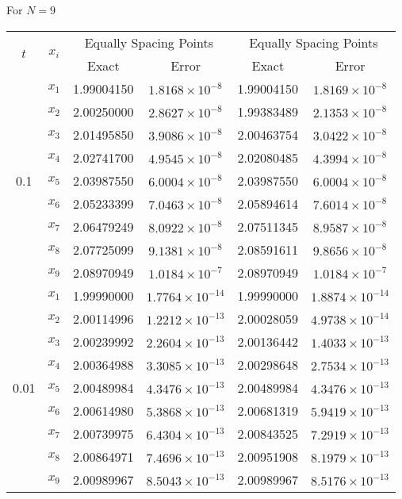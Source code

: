 \documentclass[12pt, a4paper]{article}
\begin{document}
For \( N = 9 \)

\begin{table}[ht]
	\renewcommand{\arraystretch}{1.5}
	\centering
	\begin{tabular}{|c|c|c|c|c|c|}
		\hline
		\multirow{2}{*}{\( t \)} & \multirow{2}{*}{\( x_i \)} & \multicolumn{2}{c|}{Equally Spacing Points} & \multicolumn{2}{c|}{Equally Spacing Points} \\
		\cline{3-6}
		& & Exact & Error & Exact & Error \\
		\hline
		\multirow{9}{*}{0.1} & \( x_1 \) & 1.99004150 & \( 1.8168 \times 10^{-8} \) & 1.99004150 & \( 1.8169 \times 10^{-8} \) \\
		& \( x_2 \) & 2.00250000 & \( 2.8627 \times 10^{-8} \) & 1.99383489 & \( 2.1353 \times 10^{-8} \) \\
		& \( x_3 \) & 2.01495850 & \( 3.9086 \times 10^{-8} \) & 2.00463754 & \( 3.0422 \times 10^{-8} \) \\
		& \( x_4 \) & 2.02741700 & \( 4.9545 \times 10^{-8} \) & 2.02080485 & \( 4.3994 \times 10^{-8} \) \\
		& \( x_5 \) & 2.03987550 & \( 6.0004 \times 10^{-8} \) & 2.03987550 & \( 6.0004 \times 10^{-8} \) \\
		& \( x_6 \) & 2.05233399 & \( 7.0463 \times 10^{-8} \) & 2.05894614 & \( 7.6014 \times 10^{-8} \) \\
		& \( x_7 \) & 2.06479249 & \( 8.0922 \times 10^{-8} \) & 2.07511345 & \( 8.9587 \times 10^{-8} \) \\
		& \( x_8 \) & 2.07725099 & \( 9.1381 \times 10^{-8} \) & 2.08591611 & \( 9.8656 \times 10^{-8} \) \\
		& \( x_9 \) & 2.08970949 & \( 1.0184 \times 10^{-7} \) & 2.08970949 & \( 1.0184 \times 10^{-7} \) \\
		\hline
		\multirow{9}{*}{0.01} & \( x_1 \) & 1.99990000 & \( 1.7764 \times 10^{-14} \) & 1.99990000 & \( 1.8874 \times 10^{-14} \) \\
		& \( x_2 \) & 2.00114996 & \( 1.2212 \times 10^{-13} \) & 2.00028059 & \( 4.9738 \times 10^{-14} \) \\
		& \( x_3 \) & 2.00239992 & \( 2.2604 \times 10^{-13} \) & 2.00136442 & \( 1.4033 \times 10^{-13} \) \\
		& \( x_4 \) & 2.00364988 & \( 3.3085 \times 10^{-13} \) & 2.00298648 & \( 2.7534 \times 10^{-13} \) \\
		& \( x_5 \) & 2.00489984 & \( 4.3476 \times 10^{-13} \) & 2.00489984 & \( 4.3476 \times 10^{-13} \) \\
		& \( x_6 \) & 2.00614980 & \( 5.3868 \times 10^{-13} \) & 2.00681319 & \( 5.9419 \times 10^{-13} \) \\
		& \( x_7 \) & 2.00739975 & \( 6.4304 \times 10^{-13} \) & 2.00843525 & \( 7.2919 \times 10^{-13} \) \\
		& \( x_8 \) & 2.00864971 & \( 7.4696 \times 10^{-13} \) & 2.00951908 & \( 8.1979 \times 10^{-13} \) \\
		& \( x_9 \) & 2.00989967 & \( 8.5043 \times 10^{-13} \) & 2.00989967 & \( 8.5176 \times 10^{-13} \) \\
		\hline
	\end{tabular}
\end{table}
\end{document}
